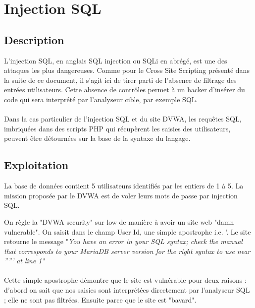
\newpage
\section{Injection SQL }


\subsection{Description}
L'injection SQL, en anglais SQL  injection ou SQLi en abrégé, est une des attaques les plus dangereuses. Comme pour le Cross Site Scripting présenté dans la suite de ce document, il s'agit ici de tirer parti de l'absence de filtrage des entrées utilisateurs. Cette absence de contrôles permet à un hacker d'insérer du code qui sera interprété par l'analyseur cible, par exemple SQL.

\paragraph{}
Dans la cas particulier de l'injection SQL et du site DVWA, les requêtes SQL, imbriquées dans des scripts PHP qui récupèrent les saisies des utilisateurs, peuvent être détournées sur la base de la syntaxe du langage.




\subsection{Exploitation}

La base de données contient 5 utilisateurs identifiés par les entiers de 1 à 5.
La mission proposée par le DVWA est de voler leurs mots de passe par injection SQL.

On règle la "DVWA security" sur low de manière à avoir un site web "damn vulnerable".
On saisit dans le champ User Id, une simple apostrophe i.e. '. Le site retourne le message
"\it {You have an error in your SQL syntax; check the manual that corresponds to your MariaDB server version for the right syntax to use near ''''' at line 1}"

\paragraph{}Cette simple apostrophe démontre que le site est vulnérable pour deux raisons : d'abord on sait que nos saisies sont interprétées directement par l'analyseur SQL ; elle ne sont pas filtrées. Ensuite parce que le site est "bavard".


